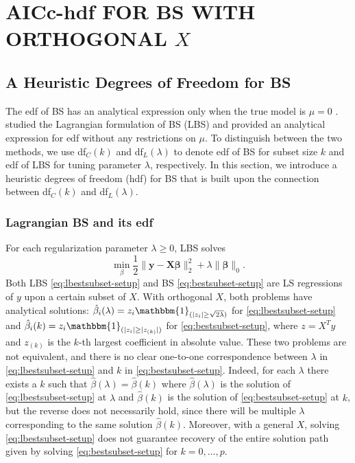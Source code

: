\section{AICc-hdf FOR BS WITH ORTHOGONAL \texorpdfstring{$X$}{Lg}}
\label{sec:aicc_hdf}
\subsection{A Heuristic Degrees of Freedom for BS}
The edf of BS has an analytical expression only when the true model is $\mu=0$ \citep{Ye1998}. \citet{Tibshirani2015} studied the Lagrangian formulation of BS (LBS) and provided an analytical expression for edf without any restrictions on $\mu$. To distinguish between the two methods, we use df$_C(k)$ and df$_L(\lambda)$ to denote edf of BS for subset size $k$ and edf of LBS for tuning parameter $\lambda$, respectively. In this section, we introduce a heuristic degrees of freedom (hdf) for BS that is built upon the connection between df$_C(k)$ and df$_L(\lambda)$.

\subsubsection{Lagrangian BS and its edf}
For each regularization parameter $\lambda \ge 0$, LBS solves
\begin{equation}
	\min_\beta \frac{1}{2} \lVert \mathbf{y}-\mathbf{X\beta}\rVert_2^2 + \lambda\lVert \mathbf{\beta} \rVert_0.
\label{eq:lbestsubset-setup}
\end{equation} 
Both LBS \eqref{eq:lbestsubset-setup} and BS \eqref{eq:bestsubset-setup} are LS regressions of $y$ upon a certain subset of $X$. With orthogonal $X$, both problems have analytical solutions: $\hat{\beta}_i(\lambda)=z_i \mathbbm{1}_{(|z_{i}| \ge \sqrt{2\lambda})}$ for \eqref{eq:lbestsubset-setup} and $\hat{\beta}_i(k)=z_i \mathbbm{1}_{(|z_{i}| \ge |z_{(k)}|)}$ for \eqref{eq:bestsubset-setup}, where $z=X^T y$ and $z_{(k)}$ is the $k$-th largest coefficient in absolute value. These two problems are not equivalent, and there is no clear one-to-one correspondence between $\lambda$ in \eqref{eq:lbestsubset-setup} and $k$ in \eqref{eq:bestsubset-setup}. Indeed, for each $\lambda$ there exists a $k$ such that $\hat{\beta}(\lambda) = \hat{\beta}(k)$ where $\hat{\beta}(\lambda)$ is the solution of \eqref{eq:lbestsubset-setup} at $\lambda$ and $\hat{\beta}(k)$ is the solution of \eqref{eq:bestsubset-setup} at $k$, but the reverse does not necessarily hold, since there will be multiple $\lambda$ corresponding to the same solution $\hat{\beta}(k)$. Moreover, with a general $X$, solving \eqref{eq:lbestsubset-setup} does not guarantee recovery of the entire solution path given by solving \eqref{eq:bestsubset-setup} for $k=0,\dots,p$.

